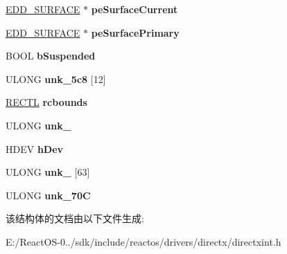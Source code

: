 \begin{DoxyCompactItemize}
\hyperlink{struct___e_d_d___s_u_r_f_a_c_e}{E\+D\+D\+\_\+\+S\+U\+R\+F\+A\+CE} $\ast$ {\bfseries pe\+Surface\+Current}
\item 
\mbox{\label{struct___e_d_d___d_i_r_e_c_t_d_r_a_w___g_l_o_b_a_l_a87849ef22cf6f4a8d3df5c3c98802b63}} 
\hyperlink{struct___e_d_d___s_u_r_f_a_c_e}{E\+D\+D\+\_\+\+S\+U\+R\+F\+A\+CE} $\ast$ {\bfseries pe\+Surface\+Primary}
\item 
\mbox{\label{struct___e_d_d___d_i_r_e_c_t_d_r_a_w___g_l_o_b_a_l_a7c47fa3a091efb752c32f5519e114fa3}} 
B\+O\+OL {\bfseries b\+Suspended}
\item 
\mbox{\label{struct___e_d_d___d_i_r_e_c_t_d_r_a_w___g_l_o_b_a_l_ae1c27780b9f3c87b541045502423f57a}} 
U\+L\+O\+NG {\bfseries unk\+\_\+5c8} \mbox{[}12\mbox{]}
\item 
\mbox{\label{struct___e_d_d___d_i_r_e_c_t_d_r_a_w___g_l_o_b_a_l_a8f616e6d96a399cdce4c2eedcdf3bb7a}} 
\hyperlink{struct___r_e_c_t_l}{R\+E\+C\+TL} {\bfseries rcbounds}
\item 
\mbox{\label{struct___e_d_d___d_i_r_e_c_t_d_r_a_w___g_l_o_b_a_l_a635903059c8730ef2c1dd09347d85abf}} 
U\+L\+O\+NG {\bfseries unk\+\_}
\item 
\mbox{\label{struct___e_d_d___d_i_r_e_c_t_d_r_a_w___g_l_o_b_a_l_a861f514d62adf2a77181f19027cf828c}} 
H\+D\+EV {\bfseries h\+Dev}
\item 
\mbox{\label{struct___e_d_d___d_i_r_e_c_t_d_r_a_w___g_l_o_b_a_l_a83f93d77f97156ae8fe337e58455f2b2}} 
U\+L\+O\+NG {\bfseries unk\+\_} \mbox{[}63\mbox{]}
\item 
\mbox{\label{struct___e_d_d___d_i_r_e_c_t_d_r_a_w___g_l_o_b_a_l_a4eed594a3a02993aa1c5e8f752cfc1ea}} 
U\+L\+O\+NG {\bfseries unk\+\_\+70C}
\end{DoxyCompactItemize}


该结构体的文档由以下文件生成\+:\begin{DoxyCompactItemize}
\item 
E\+:/\+React\+O\+S-\/0../sdk/include/reactos/drivers/directx/directxint.\+h\end{DoxyCompactItemize}
